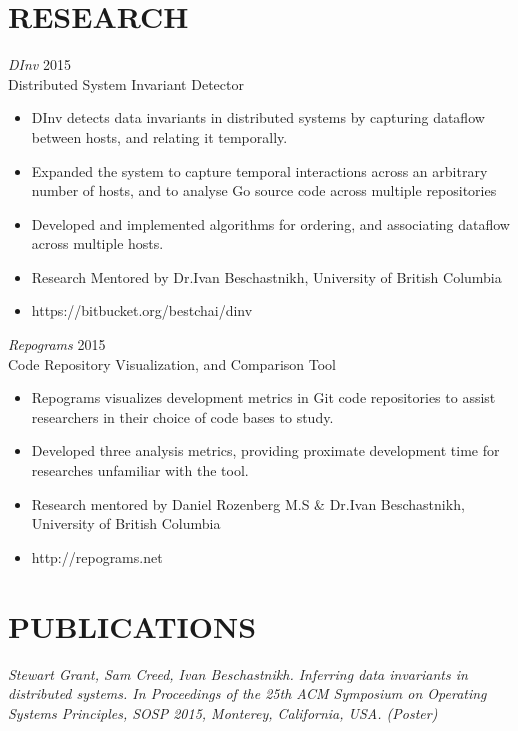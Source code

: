 \documentclass[line,margin]{res}
\begin{document}
\address{3549 Puget Drive, Vancouver, BC }
\address{(604) 970-2469}
\address{v9c9@ugrad.cs.ubc.ca}
\begin{resume}
\section{RESEARCH}
{\sl DInv} \hfill 2015\\
    Distributed System Invariant Detector
\begin{itemize} \itemsep -2pt
        \item DInv detects data invariants in distributed systems by capturing dataflow between hosts, and relating it temporally.
        \item Expanded the system to capture temporal interactions across an arbitrary number of hosts, and to analyse Go source code across multiple repositories
        \item Developed and implemented algorithms for ordering, and associating dataflow across multiple hosts.
        \item Research Mentored by Dr.Ivan Beschastnikh, University of British Columbia
        \item https://bitbucket.org/bestchai/dinv
\end{itemize}

{\sl Repograms} \hfill 2015\\
	Code Repository Visualization, and Comparison Tool
\begin{itemize} \itemsep -2pt
        \item Repograms visualizes development metrics in Git code repositories to assist researchers in their choice of code bases to study.
        \item Developed three analysis metrics, providing proximate development time for researches unfamiliar with the tool.
        \item Research mentored by Daniel Rozenberg M.S \& Dr.Ivan Beschastnikh, University of British Columbia
		\item http://repograms.net
\end{itemize}

\section{PUBLICATIONS}
{\sl Stewart Grant, Sam Creed, Ivan Beschastnikh. Inferring data invariants in distributed systems. In \it{Proceedings of the 25th ACM Symposium on Operating Systems Principles, SOSP 2015}, Monterey, California, USA. (Poster)}


\end{resume}
\end{document}
